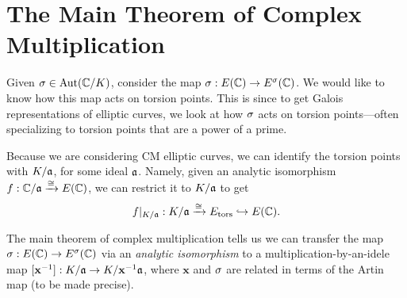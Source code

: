 \section{The Main Theorem of Complex Multiplication}
Given $\sigma\in \operatorname{Aut}(\mathbb{C}/K)$, consider the map $\sigma: E(\mathbb{C})\to E^{\sigma}(\mathbb{C})$. We would like to know how this map acts on torsion points. This is since to get Galois representations of elliptic curves, we look at how $\sigma$ acts on torsion points---often specializing to torsion points that are a power of a prime.

Because we are considering CM elliptic curves, we can identify the torsion points with $K/\mathfrak{a}$, for some ideal $\mathfrak{a}$. Namely, given an analytic isomorphism $f:\mathbb{C}/\mathfrak{a}\xrightarrow{\cong} E(\mathbb{C})$, we can restrict it to $K/\mathfrak{a}$ to get
\[
f|_{K/\mathfrak{a}}:K/\mathfrak{a}\xrightarrow{\cong} E_{\text{tors}} \hookrightarrow E(\mathbb{C}).
\]

The main theorem of complex multiplication tells us we can transfer the map $\sigma:E(\mathbb{C})\to E^{\sigma}(\mathbb{C})$ via an {\it analytic isomorphism} to a multiplication-by-an-idele map $[\mathbf x^{-1}]:K/\mathfrak{a}\to K/\mathbf x^{-1}\mathfrak{a}$, where $\mathbf x$ and $\sigma$ are related in terms of the Artin map (to be made precise).

